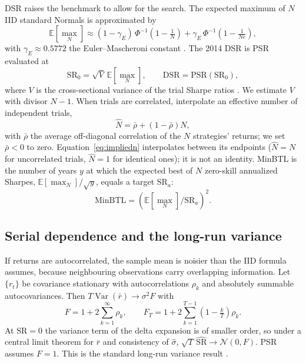 \documentclass[11pt,a4paper]{article}
\newcommand{\SR}{\mathrm{SR}}
\newcommand{\hSR}{\widehat{\mathrm{SR}}}
\newcommand{\E}{\mathbb{E}}
\newcommand{\Var}{\operatorname{Var}}
\begin{document}
DSR raises the benchmark to allow for the search. The expected maximum of $N$ IID standard Normals is approximated by
\begin{equation}\label{eq:emax}
\E[\max_N]\approx(1-\gamma_E)\,\Phi^{-1}\!\left(1-\tfrac1N\right)+\gamma_E\,\Phi^{-1}\!\left(1-\tfrac1{Ne}\right),
\end{equation}
with $\gamma_E\approx0.5772$ the Euler--Mascheroni constant \citep[Eq.~2.4, p.~9]{bailey2014pseudo}. The 2014 DSR is PSR evaluated at
\begin{equation}\label{eq:dsr}
\SR_0=\sqrt{V}\,\E[\max_N],\qquad \mathrm{DSR}=\mathrm{PSR}(\SR_0),
\end{equation}
where $V$ is the cross-sectional variance of the trial Sharpe ratios \citep[Eq.~2, p.~8]{bailey2014dsr}. We estimate $V$ with divisor $N-1$. When trials are correlated, \citet[Eqs.~8--9, p.~14]{bailey2014dsr} interpolate an effective number of independent trials,
\begin{equation}\label{eq:impliedn}
\hat N=\bar\rho+(1-\bar\rho)N,
\end{equation}
with $\bar\rho$ the average off-diagonal correlation of the $N$ strategies' returns; we set $\bar\rho<0$ to zero. Equation~\eqref{eq:impliedn} interpolates between its endpoints ($\hat N=N$ for uncorrelated trials, $\hat N=1$ for identical ones); it is not an identity. MinBTL \citep[Eq.~3.2, p.~11]{bailey2014pseudo} is the number of years $y$ at which the expected best of $N$ zero-skill annualized Sharpes, $\E[\max_N]/\sqrt{y}$, equals a target $\SR_a$:
\begin{equation}\label{eq:minbtl}
\mathrm{MinBTL}=\left(\E[\max_N]/\SR_a\right)^2 .
\end{equation}

\subsection{Serial dependence and the long-run variance}
If returns are autocorrelated, the sample mean is noisier than the IID formula assumes, because neighbouring observations carry overlapping information. Let $\{r_t\}$ be covariance stationary with autocorrelations $\rho_k$ and absolutely summable autocovariances. Then $T\Var(\bar r)\to\sigma^2F$ with
\begin{equation}\label{eq:lrv}
F=1+2\sum_{k=1}^{\infty}\rho_k,\qquad F_T=1+2\sum_{k=1}^{T-1}\left(1-\tfrac{k}{T}\right)\rho_k .
\end{equation}
At $\SR=0$ the variance term of the delta expansion is of smaller order, so under a central limit theorem for $\bar r$ and consistency of $\hat\sigma$, $\sqrt T\,\hSR\to\mathcal N(0,F)$. PSR assumes $F=1$. This is the standard long-run variance result \citep[cf.][]{lo2002,newey1987}.
\end{document}
